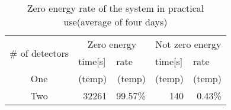 \documentclass[conference]{IEEEtran}
\begin{document}
\begin{comment}
\begin{table}[bt]
\centering
\caption{Zero energy rate of the system in practical use}
\begin{tabular}{crrrr}
\hline
\multirow{2}{*}{Date} & \multicolumn{2}{c}{Activation}                              & \multicolumn{2}{c}{Deactivation}                            \\
                      & \multicolumn{1}{l}{time{[}s{]}} & \multicolumn{1}{l}{rate} & \multicolumn{1}{l}{time{[}s{]}} & \multicolumn{1}{l}{rate} \\ \hline \hline
Aug 28th              & 32021                           & 98.88\%                   & 380                             & 1.17\%                    \\
Aug 30th              & 32354                           & 99.85\%                   & 47                              & 0.15\%                    \\
Sep 1st               & 32327                           & 99.77\%                   & 74                              & 0.23\%                    \\
Sep 6th               & 32342                           & 99.82\%                   & 59                              & 0.18\%                    \\ \hline \hline
avg/total             & 32261                           & 99.57\%                   & 140                             & 0.43\%                    \\ \hline
\end{tabular}
\label{tab:activation_ratio}
\end{table}
\end{comment}

\begin{table}[bt]
\centering
\caption{Zero energy rate of the system in practical use(average of four days)}
\begin{tabular}{crrrr}
\hline
\multirow{2}{*}{\# of detectors} & \multicolumn{2}{c}{Zero energy} & \multicolumn{2}{c}{Not zero energy} \\
                      & \multicolumn{1}{l}{time{[}s{]}} & \multicolumn{1}{l}{rate} & \multicolumn{1}{l}{time{[}s{]}} & \multicolumn{1}{l}{rate} \\ \hline \hline
One & (temp) & (temp) & (temp) & (temp) \\
Two & 32261 & 99.57\% & 140 & 0.43\% \\ \hline
\end{tabular}
\label{tab:activation_ratio}
\end{table}
\end{document}
